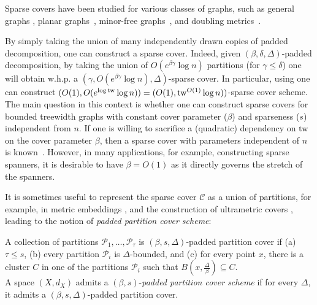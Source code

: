 \documentclass{theoretics}
\makeatletter
\newcommand{\tw}{{\rm tw}}
\newcommand{\poly}{\mathrm{poly}}
\def\cC{\ensuremath{\mathcal{C}}}
\newcommand\IfRestateTF{%
  \ifx\label\thmt@gobble@label %
    \expandafter\@firstoftwo
  \else
    \expandafter\@secondoftwo
  \fi
}
\newcommand{\RestateRemark}{\IfRestateTF{{\normalfont\bfseries (Restated) }}{}}
\makeatother
\begin{document}
Sparse covers have been studied for various classes of graphs, such as general graphs \cite{AP90}, planar graphs~\cite{BLT14}, minor-free graphs~\cite{KLMN04,BLT14,AGMW10},  and doubling metrics~\cite{Fil19Approx}. 

By simply taking the union of many independently drawn copies of padded decomposition, one can construct a sparse cover. Indeed, given $(\beta,\delta,\Delta)$-padded decomposition, by taking the union of $O(e^{\beta\gamma}\log n)$ partitions (for $\gamma\le\delta$) one will obtain w.h.p. a $(\gamma,O(e^{\beta\gamma}\log n),\Delta)$-sparse cover. In particular, using  one can construct $(O(1),O(e^{\log\tw}\log n))=(O(1),\tw^{O(1)}\log n))$-sparse cover scheme. The main question in this context is whether one can construct sparse covers for bounded treewidth graphs with constant cover parameter ($\beta$) and sparseness ($s$) independent from $n$. If one is willing to sacrifice a (quadratic) dependency on $\tw$ on the cover parameter $\beta$, then a sparse cover with parameters independent of $n$ is known~\cite{KPR93,FT03,AGGM06}. However, in many applications, for example, constructing sparse spanners, it is desirable to have $\beta = O(1)$ as it directly governs the stretch of the spanners.





It is sometimes useful to represent the sparse cover $\cC$ as a union of partitions, for example, in 
metric embeddings \cite{KLMN04}, and the construction of ultrametric covers \cite{FL22,Fil23},
leading to the notion of \emph{padded partition cover scheme}:
\begin{definition}\label{def:PaddedPartitionCover} A collection of partitions $\mathcal{P}_{1},\dots,\mathcal{P}_{\tau}$
	is $(\beta,s,\Delta)$-padded partition cover if (a) $\tau\le s$, (b) every partition $\mathcal{P}_{i}$ is $\Delta$-bounded, and (c) for every point $x$, there is a cluster $C$ in one of the partitions $\mathcal{P}_{i}$ such that $B(x,\frac{\Delta}{\beta})\subseteq C$.\\
	A space $(X,d_{X})$ admits a $(\beta,s)$-\emph{padded partition cover scheme} if for every $\Delta$, it admits a  $(\beta,s,\Delta)$-padded  partition cover.
\end{definition}
\end{document}
